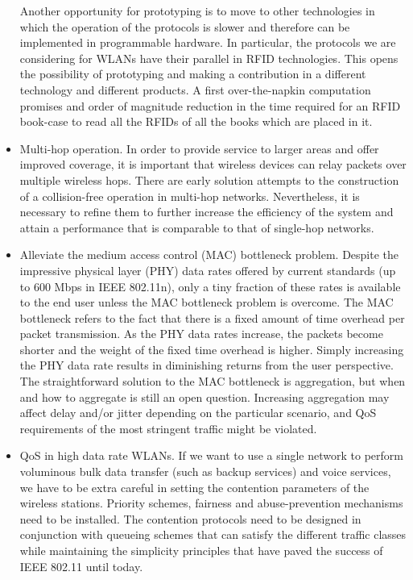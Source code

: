 \documentclass[a4paper,twocolumns]{article}%
\begin{document}
\begin{itemize}
Another opportunity for prototyping is to move to other technologies in which the operation of the protocols is slower and therefore can be implemented in programmable hardware.
In particular, the protocols we are considering for WLANs have their parallel in RFID technologies.
This opens the possibility of prototyping and making a contribution in a different technology and different products.
A first over-the-napkin computation promises and order of magnitude reduction in the time required for an RFID book-case to read all the RFIDs of all the books which are placed in it.
\item Multi-hop operation.
In order to provide service to larger areas and offer improved coverage, it is important that wireless devices can relay packets over multiple wireless hops.
There are early solution attempts to the construction of a collision-free operation in multi-hop networks.
Nevertheless, it is necessary to refine them to further increase the efficiency of the system and attain a performance that is comparable to that of single-hop networks.
\item Alleviate the medium access control (MAC) bottleneck problem.
Despite the impressive physical layer (PHY) data rates offered by current standards (up to 600 Mbps in IEEE 802.11n), only a tiny fraction of these rates is available to the end user unless the MAC bottleneck problem is overcome.
The MAC bottleneck refers to the fact that there is a fixed amount of time overhead per packet transmission.
As the PHY data rates increase, the packets become shorter and the weight of the fixed time overhead is higher.
Simply increasing the PHY data rate results in diminishing returns from the user perspective.
The straightforward solution to the MAC bottleneck is aggregation, but when and how to aggregate is still an open question.
Increasing aggregation may affect delay and/or jitter depending on the particular scenario, and QoS requirements of the most stringent traffic might be violated. 
\item QoS in high data rate WLANs. 
If we want to use a single network to perform voluminous bulk data transfer (such as backup services) and voice services, we have to be extra careful in setting the contention parameters of the wireless stations.
Priority schemes, fairness and abuse-prevention mechanisms need to be installed.
The contention protocols need to be designed in conjunction with queueing schemes that can satisfy the different traffic classes while maintaining the simplicity principles that have paved the success of IEEE 802.11 until today.

\end{itemize}
\end{document}

